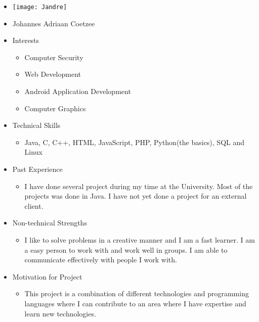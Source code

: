 
\begin{itemize}
	\item[] \texttt{[image: Jandre]}
	\item[] Johannes Adriaan Coetzee
	\item Interests
	\begin{itemize}
		\item Computer Security
		\item Web Development
		\item Android Application Development
		\item Computer Graphics
	\end{itemize}
	\item Technical Skills
	\begin{itemize}
		\item[] Java, C, C++, HTML, JavaScript, PHP, Python(the basics), SQL and Linux 
	\end{itemize}
	\item Past Experience
	\begin{itemize}
		\item[] I have done several project during my time at the University. Most of the projects was done in Java. I have not yet done a project for an external client.
	\end{itemize}
	\item Non-technical Strengths
	\begin{itemize}
		\item[] I like to solve problems in a creative manner and I am a fast learner. I am a easy person to work with and work well in groups. I am able to communicate effectively with people I work with.
	\end{itemize}
	\item Motivation for Project
	\begin{itemize}
		\item[] This project is a combination of different technologies and programming languages where I can contribute to an area where I have expertise and learn new technologies.
	\end{itemize}
\end{itemize}